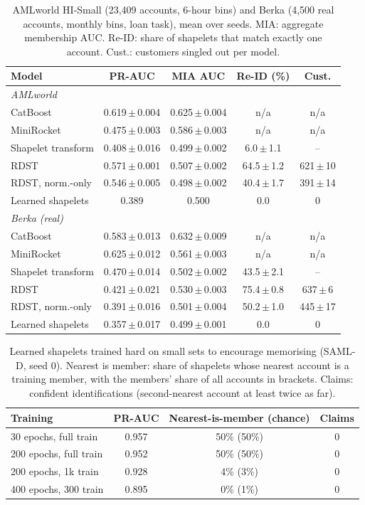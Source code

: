 \begin{table}[t]
\caption{AMLworld HI-Small (23,409 accounts, 6-hour bins) and Berka (4,500 real accounts, monthly bins, loan task), mean over seeds. MIA: aggregate membership AUC. Re-ID: share of shapelets that match exactly one account. Cust.: customers singled out per model.}
\label{tab:aml}
\small\setlength{\tabcolsep}{2.5pt}
\centering
\begin{tabular}{lcccc}
\toprule
Model & PR-AUC & MIA AUC & Re-ID (\%) & Cust. \\
\midrule
\multicolumn{5}{l}{\emph{AMLworld}} \\
CatBoost & 0.619\,$\pm$\,0.004 & 0.625\,$\pm$\,0.004 & n/a & n/a \\
MiniRocket & 0.475\,$\pm$\,0.003 & 0.586\,$\pm$\,0.003 & n/a & n/a \\
Shapelet transform & 0.408\,$\pm$\,0.016 & 0.499\,$\pm$\,0.002 & 6.0\,$\pm$\,1.1 & -- \\
RDST & 0.571\,$\pm$\,0.001 & 0.507\,$\pm$\,0.002 & 64.5\,$\pm$\,1.2 & 621\,$\pm$\,10 \\
RDST, norm.-only & 0.546\,$\pm$\,0.005 & 0.498\,$\pm$\,0.002 & 40.4\,$\pm$\,1.7 & 391\,$\pm$\,14 \\
Learned shapelets & 0.389 & 0.500 & 0.0 & 0 \\
\multicolumn{5}{l}{\emph{Berka (real)}} \\
CatBoost & 0.583\,$\pm$\,0.013 & 0.632\,$\pm$\,0.009 & n/a & n/a \\
MiniRocket & 0.625\,$\pm$\,0.012 & 0.561\,$\pm$\,0.003 & n/a & n/a \\
Shapelet transform & 0.470\,$\pm$\,0.014 & 0.502\,$\pm$\,0.002 & 43.5\,$\pm$\,2.1 & -- \\
RDST & 0.421\,$\pm$\,0.021 & 0.530\,$\pm$\,0.003 & 75.4\,$\pm$\,0.8 & 637\,$\pm$\,6 \\
RDST, norm.-only & 0.391\,$\pm$\,0.016 & 0.501\,$\pm$\,0.004 & 50.2\,$\pm$\,1.0 & 445\,$\pm$\,17 \\
Learned shapelets & 0.357\,$\pm$\,0.017 & 0.499\,$\pm$\,0.001 & 0.0 & 0 \\
\bottomrule\end{tabular}\end{table}
\begin{table}[t]
\caption{Learned shapelets trained hard on small sets to encourage memorising (SAML-D, seed 0). Nearest is member: share of shapelets whose nearest account is a training member, with the members' share of all accounts in brackets. Claims: confident identifications (second-nearest account at least twice as far).}
\label{tab:probe}
\small\setlength{\tabcolsep}{3pt}
\centering
\begin{tabular}{lccc}
\toprule
Training & PR-AUC & Nearest-is-member (chance) & Claims \\
\midrule
30 epochs, full train & 0.957 & 50\% (50\%) & 0 \\
200 epochs, full train & 0.952 & 50\% (50\%) & 0 \\
200 epochs, 1k train & 0.928 & 4\% (3\%) & 0 \\
400 epochs, 300 train & 0.895 & 0\% (1\%) & 0 \\
\bottomrule\end{tabular}\end{table}
